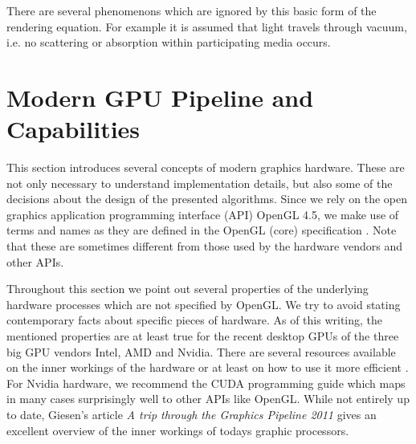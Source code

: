 \documentclass[thesis.tex]{subfiles}
\begin{document}
There are several phenomenons which are ignored by this basic form of the rendering equation.
For example it is assumed that light travels through vacuum, i.e. no scattering or absorption within participating media occurs.



\section{Modern GPU Pipeline and Capabilities}
This section introduces several concepts of modern graphics hardware.
These are not only necessary to understand implementation details, but also some of the decisions about the design of the presented algorithms.
Since we rely on the open graphics application programming interface (API) OpenGL 4.5, we make use of terms and names as they are defined in the OpenGL (core) specification \cite{bib:openglspec}.
Note that these are sometimes different from those used by the hardware vendors and other APIs.

Throughout this section we point out several properties of the underlying hardware processes which are not specified by OpenGL.
We try to avoid stating contemporary facts about specific pieces of hardware.
As of this writing, the mentioned properties are at least true for the recent desktop GPUs of the three big GPU vendors Intel, AMD and Nvidia.
There are several resources available on the inner workings of the hardware or at least on how to use it more efficient \cite{bib:intelhardwaredoc, bib:amdhardwaredoc}.
For Nvidia hardware, we recommend the CUDA programming guide \cite{bib:cudaprogguide} which maps in many cases surprisingly well to other APIs like OpenGL.
While not entirely up to date, Giesen's article \emph{A trip through the Graphics Pipeline 2011} \cite{bib:tripthroughgraphicspipe} gives an excellent overview of the inner workings of todays graphic processors.

\end{document}

